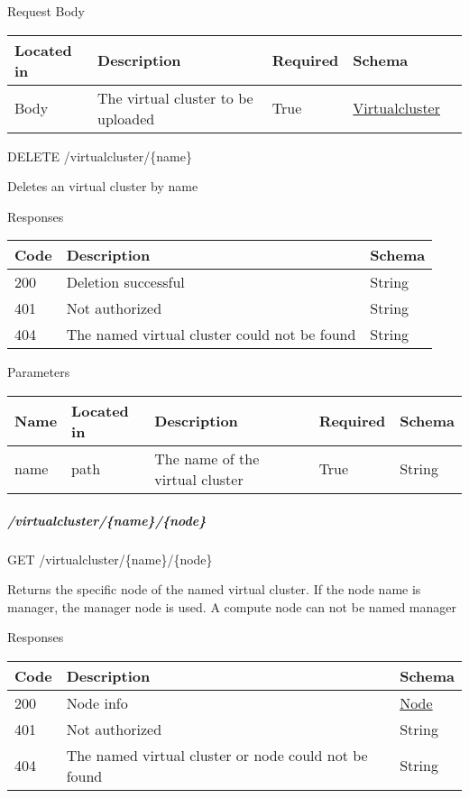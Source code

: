 Request Body

\begin{longtable}[]{@{}p{}p{}p{}p{}p{}@{}}
\toprule
Located in & Description & Required & Schema &\tabularnewline
\midrule
\endhead
Body & The virtual cluster to be uploaded & True &
\protect\hyperlink{virtualcluster}{Virtualcluster} &\tabularnewline
\bottomrule
\end{longtable}

DELETE /virtualcluster/\{name\}

Deletes an virtual cluster by name

Responses

\begin{longtable}[]{@{}p{}p{}p{}@{}}
\toprule
Code & Description & Schema\tabularnewline
\midrule
\endhead
200 & Deletion successful & String\tabularnewline
401 & Not authorized & String\tabularnewline
404 & The named virtual cluster could not be found &
String\tabularnewline
\bottomrule
\end{longtable}

Parameters

\begin{longtable}[]{@{}p{}p{}p{}p{}p{}@{}}
\toprule
Name & Located in & Description & Required & Schema\tabularnewline
\midrule
\endhead
name & path & The name of the virtual cluster & True &
String\tabularnewline
\bottomrule
\end{longtable}

\hypertarget{virtualclusternamenode}{%
\subparagraph{/virtualcluster/\{name\}/\{node\}}\label{virtualclusternamenode}}

GET /virtualcluster/\{name\}/\{node\}

Returns the specific node of the named virtual cluster. If the node name
is manager, the manager node is used. A compute node can not be named
manager

Responses

\begin{longtable}[]{@{}p{}p{}p{}@{}}
\toprule
Code & Description & Schema\tabularnewline
\midrule
\endhead
200 & Node info & \protect\hyperlink{node}{Node}\tabularnewline
401 & Not authorized & String\tabularnewline
404 & The named virtual cluster or node could not be found &
String\tabularnewline
\bottomrule
\end{longtable}

